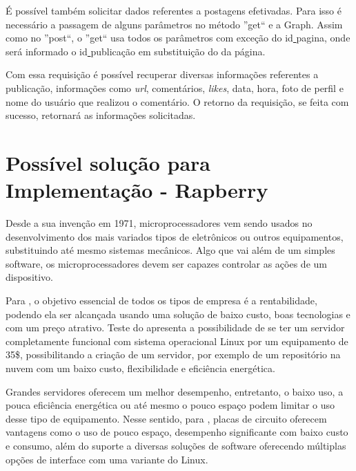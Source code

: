 É possível também solicitar dados referentes a postagens efetivadas. Para isso é necessário a passagem de alguns parâmetros no método ''get`` e a Graph. Assim como no ''post``, o ''get`` usa todos os parâmetros com exceção do id\underline{{ }}pagina, onde será informado o id\underline{{ }}publicação em substituição do da página.

Com essa requisição é possível recuperar diversas informações referentes a publicação, informações como \textit{url}, comentários, \textit{likes}, data, hora, foto de perfil e nome do usuário que realizou o comentário. O retorno da requisição, se feita com sucesso, retornará as informações solicitadas.
 

\section{Possível solução para Implementação - Rapberry}
Desde a sua invenção em 1971, microprocessadores vem sendo usados no desenvolvimento dos mais variados tipos de eletrônicos ou outros equipamentos, substituindo até mesmo sistemas mecânicos. Algo que vai além de um simples software, os microprocessadores devem ser capazes controlar as ações de um dispositivo. \cite{rosenstark2007}

Para \cite{aristotelous2016}, o objetivo essencial de todos os tipos de empresa é a rentabilidade, podendo ela ser alcançada usando uma solução de baixo custo, boas tecnologias e com um preço atrativo. Teste do \cite{aristotelous2016} apresenta a possibilidade de se ter um servidor completamente funcional com sistema operacional Linux por um equipamento de 35\$, possibilitando a criação de um servidor, por exemplo de um repositório na nuvem com um baixo custo, flexibilidade e eficiência energética. 

Grandes servidores oferecem um melhor desempenho, entretanto, o baixo uso, a pouca eficiência energética ou até mesmo o pouco espaço podem limitar o uso desse tipo de equipamento. Nesse sentido, para \cite{cusick2014}, placas de circuito oferecem vantagens como o uso de pouco espaço, desempenho significante com baixo custo e consumo, além do suporte a diversas soluções de software oferecendo múltiplas opções de interface com uma variante do Linux. 